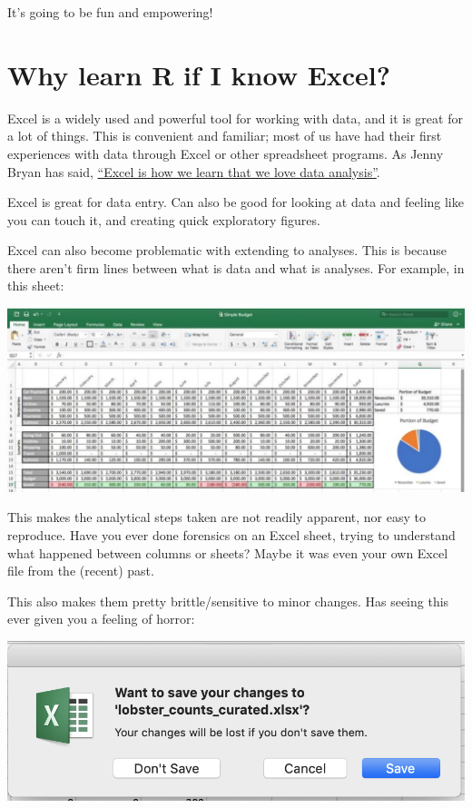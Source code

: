 \documentclass[]{book}
\begin{document}
It's going to be fun and empowering!

\hypertarget{why-learn-r-if-i-know-excel}{%
\section{Why learn R if I know Excel?}\label{why-learn-r-if-i-know-excel}}

Excel is a widely used and powerful tool for working with data, and it is great for a lot of things. This is convenient and familiar; most of us have had their first experiences with data through Excel or other spreadsheet programs. As Jenny Bryan has said, \href{}{``Excel is how we learn that we love data analysis''}.

Excel is great for data entry. Can also be good for looking at data and feeling like you can touch it, and creating quick exploratory figures.

Excel can also become problematic with extending to analyses. This is because there aren't firm lines between what is data and what is analyses. For example, in this sheet:

\includegraphics[width=0.7\linewidth]{img/excel-sheet-example}

This makes the analytical steps taken are not readily apparent, nor easy to reproduce. Have you ever done forensics on an Excel sheet, trying to understand what happened between columns or sheets? Maybe it was even your own Excel file from the (recent) past.

This also makes them pretty brittle/sensitive to minor changes. Has seeing this ever given you a feeling of horror:

\includegraphics[width=0.8\linewidth]{img/want-to-save-changes-excel}
\end{document}
